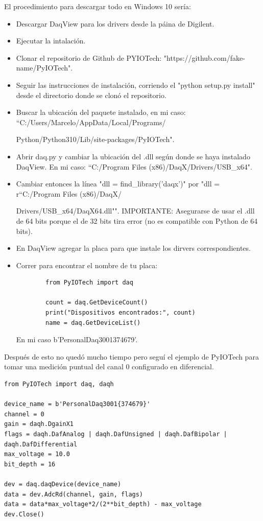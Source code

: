 El procedimiento para descargar todo en Windows 10 sería:
\begin{itemize}
	\item Descargar DaqView para los drivers desde la páina de Digilent. 
	\item Ejecutar la intalación.
	\item Clonar el repositorio de Github de PYIOTech: "https://github.com/fake-name/PyIOTech".
	\item Seguir las instrucciones de instalación, corriendo el "python setup.py install" desde el directorio donde se clonó el repositorio.
	\item Buscar la ubicación del paquete instalado, en mi caso: ``C:/Users/Marcelo/AppData/Local/Programs/
	
	Python/Python310/Lib/site-packages/PyIOTech". %
	\item Abrir daq.py y cambiar la ubicación del .dll según donde se haya instalado DaqView. En mi caso: ``C:/Program Files (x86)/DaqX/Drivers/USB\_x64". %
	\item Cambiar entonces la línea "dll = find\_library('daqx')" por "dll = r``C:/Program Files (x86)/DaqX/
	
	Drivers/USB\_x64/DaqX64.dll"". IMPORTANTE: Asegurarse de usar el .dll de 64 bits porque el de 32 bits tira error (no es compatible con Python de 64 bits). %
	\item En DaqView agregar la placa para que instale los dirvers correspondientes.
	\item Correr para encontrar el nombre de tu placa:
	\begin{lstlisting} 
		from PyIOTech import daq
		
		count = daq.GetDeviceCount()  
		print("Dispositivos encontrados:", count)
		name = daq.GetDeviceList()
	\end{lstlisting}
	En mi caso b'PersonalDaq3001{374679}'.
\end{itemize} %

Después de esto no quedó mucho tiempo pero seguí el ejemplo de PyIOTech para tomar una medición puntual del canal 0 configurado en diferencial. 

\begin{lstlisting}
from PyIOTech import daq, daqh
	
device_name = b'PersonalDaq3001{374679}' 
channel = 0
gain = daqh.DgainX1
flags = daqh.DafAnalog | daqh.DafUnsigned | daqh.DafBipolar | daqh.DafDifferential
max_voltage = 10.0
bit_depth = 16
	
dev = daq.daqDevice(device_name)
data = dev.AdcRd(channel, gain, flags)
data = data*max_voltage*2/(2**bit_depth) - max_voltage
dev.Close()
\end{lstlisting}

